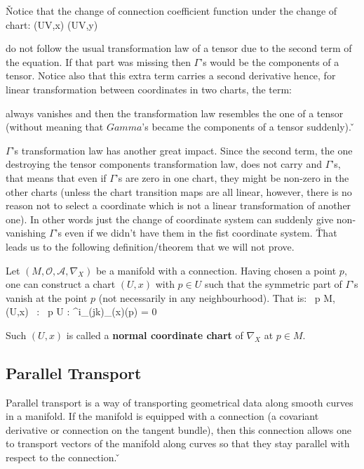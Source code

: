 \v

Notice that the change of connection coefficient function under the change of chart:
\bse
(U\cap V,x) \to (U\cap V,y)
\ese

do not follow the usual transformation law of a tensor due to the second term of the equation. If that part was
missing then $\Gamma$'s would be the components of a tensor. Notice also that this extra term carries a second
derivative hence, for linear transformation between coordinates in two charts, the term:
\bse
{}
\ese

always vanishes and then the transformation law resembles the one of a tensor (without meaning that $Gamma$'s became
the components of a tensor suddenly). \v

$\Gamma$'s transformation law has another great impact. Since the second term, the one destroying the tensor
components transformation law, does not carry and $\Gamma$'s, that means that even if $\Gamma$'s are zero in one
chart, they might be non-zero in the other charts (unless the chart transition maps are all linear, however, there is
no reason not to select a coordinate which is not a linear transformation of another one). In other words just the
change of coordinate system can suddenly give non-vanishing $\Gamma$'s even if we didn't have them in the fist
coordinate system. \v

That leads us to the following definition/theorem that we will not prove.

Let $(M, \mathcal{O}, \mathscr{A}, \nabla_X)$ be a manifold with a connection. Having chosen a point $p$, one can
construct a chart $(U,x)$ with $p \in U$ such that the symmetric part of $\Gamma$'s vanish at the point $p$ (not
necessarily in any neighbourhood). That is:
\bse
\forall \, p \in M, \, \exists \, (U,x) \in {} \, : \, p \in U : {\Gamma^{i}_{(jk)}}_{(x)}(p) = 0
\ese

Such $(U,x)$ is called a \textbf{normal coordinate chart} of $\nabla_X$ at $p \in M$.
\ed

\subsection{Parallel Transport}

Parallel transport is a way of transporting geometrical data along smooth curves in a manifold. If the manifold is
equipped with a connection (a covariant derivative or connection on the tangent bundle), then this connection allows
one to transport vectors of the manifold along curves so that they stay parallel with respect to the connection. \v

